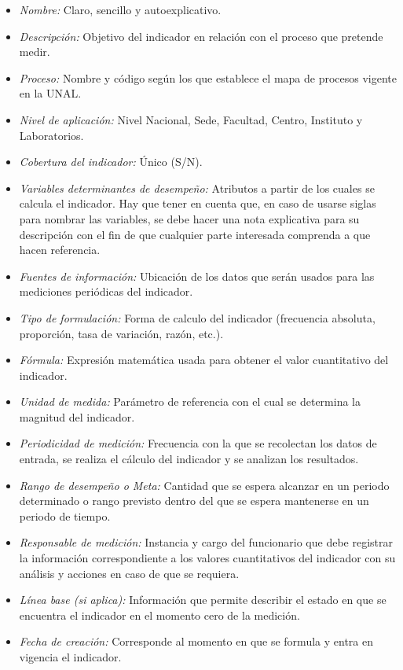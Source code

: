 \documentclass[
]{book}
\providecommand{\tightlist}{%
  \setlength{\itemsep}{0pt}\setlength{\parskip}{0pt}}
\begin{document}
\begin{itemize}
\tightlist
\item
  \emph{Nombre:} Claro, sencillo y autoexplicativo.
\item
  \emph{Descripción:} Objetivo del indicador en relación con el proceso que pretende medir.
\item
  \emph{Proceso:} Nombre y código según los que establece el mapa de procesos vigente en la UNAL.
\item
  \emph{Nivel de aplicación:} Nivel Nacional, Sede, Facultad, Centro, Instituto y Laboratorios.
\item
  \emph{Cobertura del indicador:} Único (S/N).
\item
  \emph{Variables determinantes de desempeño:} Atributos a partir de los cuales se calcula el indicador. Hay que tener en cuenta que, en caso de usarse siglas para nombrar las variables, se debe hacer una nota explicativa para su descripción con el fin de que cualquier parte interesada comprenda a que hacen referencia.
\item
  \emph{Fuentes de información:} Ubicación de los datos que serán usados para las mediciones periódicas del indicador.
\item
  \emph{Tipo de formulación:} Forma de calculo del indicador (frecuencia absoluta, proporción, tasa de variación, razón, etc.).
\item
  \emph{Fórmula:} Expresión matemática usada para obtener el valor cuantitativo del indicador.
\item
  \emph{Unidad de medida:} Parámetro de referencia con el cual se determina la magnitud del indicador.
\item
  \emph{Periodicidad de medición:} Frecuencia con la que se recolectan los datos de entrada, se realiza el cálculo del indicador y se analizan los resultados.
\item
  \emph{Rango de desempeño o Meta:} Cantidad que se espera alcanzar en un periodo determinado o rango previsto dentro del que se espera mantenerse en un periodo de tiempo.
\item
  \emph{Responsable de medición:} Instancia y cargo del funcionario que debe registrar la información correspondiente a los valores cuantitativos del indicador con su análisis y acciones en caso de que se requiera.
\item
  \emph{Línea base (si aplica):} Información que permite describir el estado en que se encuentra el indicador en el momento cero de la medición.
\item
  \emph{Fecha de creación:} Corresponde al momento en que se formula y entra en vigencia el indicador.
\end{itemize}
\end{document}
